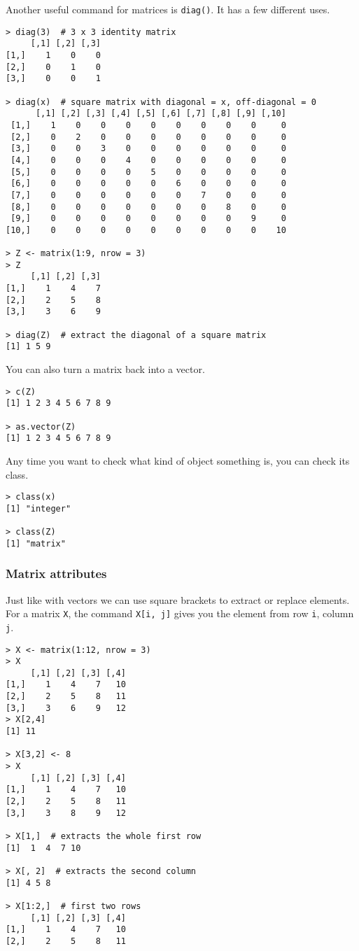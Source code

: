 Another useful command for matrices is \verb|diag()|. It has a few different uses.

\begin{lstlisting}
> diag(3)  # 3 x 3 identity matrix
     [,1] [,2] [,3]
[1,]    1    0    0
[2,]    0    1    0
[3,]    0    0    1

> diag(x)  # square matrix with diagonal = x, off-diagonal = 0
      [,1] [,2] [,3] [,4] [,5] [,6] [,7] [,8] [,9] [,10]
 [1,]    1    0    0    0    0    0    0    0    0     0
 [2,]    0    2    0    0    0    0    0    0    0     0
 [3,]    0    0    3    0    0    0    0    0    0     0
 [4,]    0    0    0    4    0    0    0    0    0     0
 [5,]    0    0    0    0    5    0    0    0    0     0
 [6,]    0    0    0    0    0    6    0    0    0     0
 [7,]    0    0    0    0    0    0    7    0    0     0
 [8,]    0    0    0    0    0    0    0    8    0     0
 [9,]    0    0    0    0    0    0    0    0    9     0
[10,]    0    0    0    0    0    0    0    0    0    10

> Z <- matrix(1:9, nrow = 3)
> Z
     [,1] [,2] [,3]
[1,]    1    4    7
[2,]    2    5    8
[3,]    3    6    9

> diag(Z)  # extract the diagonal of a square matrix
[1] 1 5 9
\end{lstlisting}

You can also turn a matrix back into a vector.

\begin{lstlisting}
> c(Z)
[1] 1 2 3 4 5 6 7 8 9

> as.vector(Z)
[1] 1 2 3 4 5 6 7 8 9
\end{lstlisting}

Any time you want to check what kind of object something is, you can check its class.

\begin{lstlisting}
> class(x)
[1] "integer"

> class(Z)
[1] "matrix"
\end{lstlisting}

\subsubsection*{Matrix attributes}

Just like with vectors we can use square brackets  to extract or replace elements. For a matrix \texttt{X}, the command \verb|X[i, j]| gives you the element from row \texttt{i}, column \texttt{j}.

\begin{lstlisting}
> X <- matrix(1:12, nrow = 3)
> X
     [,1] [,2] [,3] [,4]
[1,]    1    4    7   10
[2,]    2    5    8   11
[3,]    3    6    9   12
> X[2,4]
[1] 11

> X[3,2] <- 8
> X
     [,1] [,2] [,3] [,4]
[1,]    1    4    7   10
[2,]    2    5    8   11
[3,]    3    8    9   12

> X[1,]  # extracts the whole first row
[1]  1  4  7 10

> X[, 2]  # extracts the second column
[1] 4 5 8

> X[1:2,]  # first two rows
     [,1] [,2] [,3] [,4]
[1,]    1    4    7   10
[2,]    2    5    8   11
\end{lstlisting}

